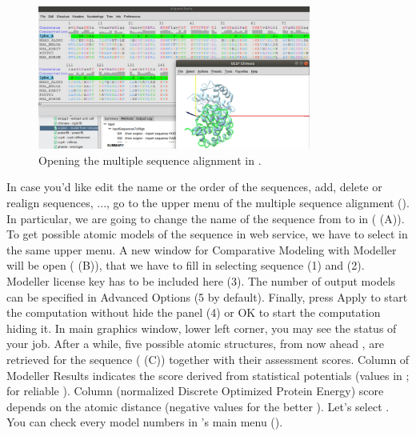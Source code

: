 \begin{itemize}
 \begin{figure}[H]
  \centering 
  \captionsetup{width=.7\linewidth} 
  \includegraphics[width=0.80\textwidth]{Images/Fig14}
  \caption{Opening the multiple sequence alignment in \chimera.}
  \label{fig:chimera_alignment}
  \end{figure}
\end{itemize}

In case you'd like edit the name or the order of the sequences, add,  delete or realign sequences, ..., go to the upper menu of the multiple sequence alignment (). In particular, we are going to change the name of the  sequence from  to  in  ( (A)). To get possible atomic models of the  sequence in \modeller web service, we have to select  in the same upper menu. A new window for Comparative Modeling with Modeller will be open ( (B)), that we have to fill in selecting  sequence (1) and  (2). Modeller license key has to be included here (3). The number of output models can be specified in Advanced Options (5 by default). Finally, press Apply to start the computation without hide the panel (4) or OK to start the computation hiding it. In \chimera main graphics window, lower left corner, you may see the status of your job. After a while, five possible atomic structures, from now ahead , are retrieved for the  sequence ( (C)) together with their assessment scores. Column  of Modeller Results indicates the score derived from statistical potentials (values in \ttt{[0,1]};  for reliable ). Column  (normalized Discrete Optimized Protein Energy) score depends on the atomic distance (negative values for the better ). Let's select  . You can check every model numbers in \chimera's main menu ().
 
